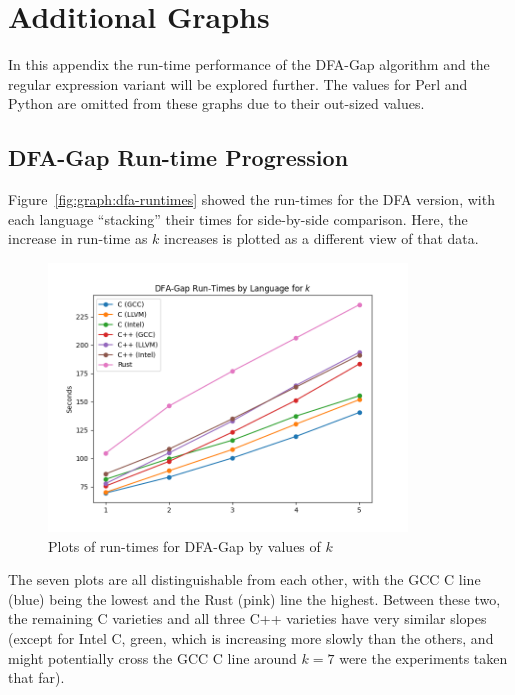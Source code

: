 \section{Additional Graphs}
\label{sec:extra_graphs}

In this appendix the run-time performance of the DFA-Gap algorithm and the regular expression variant will be explored further. The values for Perl and Python are omitted from these graphs due to their out-sized values.

\subsection{DFA-Gap Run-time Progression}
\label{subsec:dfa-gap-runtimes}

Figure~\ref{fig:graph:dfa-runtimes} showed the run-times for the DFA version, with each language ``stacking'' their times for side-by-side comparison. Here, the increase in run-time as $k$ increases is plotted as a different view of that data.

\begin{figure}[h]
	\centering
	\includegraphics[width=0.85\textwidth]{figures/k_runtimes-dfa_gap.png}
	\caption{Plots of run-times for DFA-Gap by values of $k$}
	\label{fig:graph:k_runtimes-dfa_gap}
\end{figure}

The seven plots are all distinguishable from each other, with the GCC C line (blue) being the lowest and the Rust (pink) line the highest. Between these two, the remaining C varieties and all three C++ varieties have very similar slopes (except for Intel C, green, which is increasing more slowly than the others, and might potentially cross the GCC C line around $k=7$ were the experiments taken that far).

